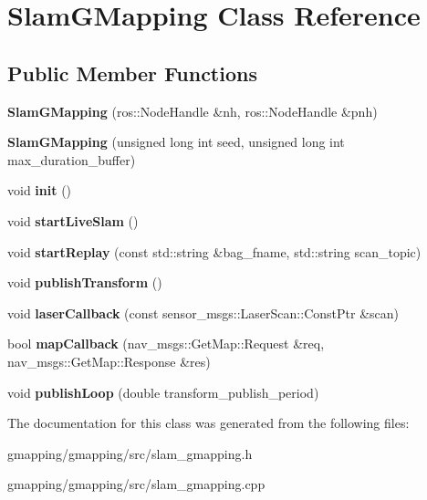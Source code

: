 \hypertarget{classSlamGMapping}{}\section{Slam\+G\+Mapping Class Reference}
\label{classSlamGMapping}
\subsection*{Public Member Functions}
\begin{DoxyCompactItemize}
\item 
\mbox{\label{classSlamGMapping_a3f9432f78c6eff17041a4b0b0f87a1ad}} 
{\bfseries Slam\+G\+Mapping} (ros\+::\+Node\+Handle \&nh, ros\+::\+Node\+Handle \&pnh)
\item 
\mbox{\label{classSlamGMapping_a6a4853715facc1ee2591955180e830a2}} 
{\bfseries Slam\+G\+Mapping} (unsigned long int seed, unsigned long int max\+\_\+duration\+\_\+buffer)
\item 
\mbox{\label{classSlamGMapping_aca7f6aaa57c8ac675068701adda348ea}} 
void {\bfseries init} ()
\item 
\mbox{\label{classSlamGMapping_ab0d5567e7a8e010ff11068fcce0d9c04}} 
void {\bfseries start\+Live\+Slam} ()
\item 
\mbox{\label{classSlamGMapping_a90bee18e7c96af13916caae4a4bfd618}} 
void {\bfseries start\+Replay} (const std\+::string \&bag\+\_\+fname, std\+::string scan\+\_\+topic)
\item 
\mbox{\label{classSlamGMapping_a2447af8faad253af05c7dc9f492b8489}} 
void {\bfseries publish\+Transform} ()
\item 
\mbox{\label{classSlamGMapping_a49172a6ae33df4daf397959789dc1c34}} 
void {\bfseries laser\+Callback} (const sensor\+\_\+msgs\+::\+Laser\+Scan\+::\+Const\+Ptr \&scan)
\item 
\mbox{\label{classSlamGMapping_a780899c48f753bf4768580fb46580d83}} 
bool {\bfseries map\+Callback} (nav\+\_\+msgs\+::\+Get\+Map\+::\+Request \&req, nav\+\_\+msgs\+::\+Get\+Map\+::\+Response \&res)
\item 
\mbox{\label{classSlamGMapping_a00a01ecfacccbfcfccc3e138de6bd00f}} 
void {\bfseries publish\+Loop} (double transform\+\_\+publish\+\_\+period)
\end{DoxyCompactItemize}


The documentation for this class was generated from the following files\+:\begin{DoxyCompactItemize}
\item 
gmapping/gmapping/src/slam\+\_\+gmapping.\+h\item 
gmapping/gmapping/src/slam\+\_\+gmapping.\+cpp\end{DoxyCompactItemize}
